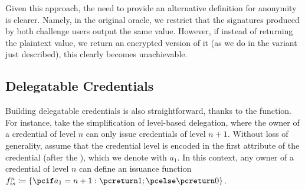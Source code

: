 Given this approach, the need to provide an alternative definition for anonymity
is clearer. Namely, in the original \CHALb oracle, we restrict that the
signatures produced by both challenge users output the same \yeval value.
However, if instead of returning the plaintext \yeval value, we return an
encrypted version of it (as we do in the variant just described), this clearly
becomes unachievable.


\subsection{Delegatable Credentials}

Building delegatable credentials is also straightforward, thanks to the \fissue
function. For instance, take the simplification of level-based delegation, where
the owner of a credential of level $n$ can only issue credentials of level
$n+1$. Without loss of generality, assume that the credential level is encoded
in the first attribute of the credential (after the \usk), which we denote with
$a_1$. In this context, any owner of a credential of level $n$ can define an
issuance function $\fissue^n \coloneqq \lbrace \pcif a_1 = n+1: \pcreturn 1;
\pcelse \pcreturn 0 \rbrace$.


